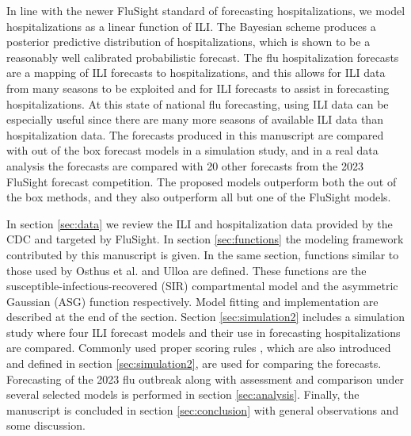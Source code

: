 In line with the newer FluSight standard of forecasting hospitalizations, we 
model hospitalizations as a linear function of ILI. The Bayesian scheme 
produces a posterior predictive distribution of hospitalizations, which is 
shown to be a reasonably well calibrated probabilistic forecast.
The flu hospitalization forecasts are a mapping of ILI forecasts to 
hospitalizations, and this allows for ILI data from many seasons to be exploited 
and for ILI forecasts to assist in forecasting hospitalizations.
At this state of national flu forecasting, using ILI data can be especially
useful since there are many more seasons of available ILI data than 
hospitalization data. 
The forecasts produced in this manuscript are compared with out of the box 
forecast models in a simulation study, and in a real data analysis the 
forecasts are compared with 20 other forecasts from the 2023 FluSight forecast
competition. The proposed models outperform both the out of the box methods, and
they also outperform all but one of the FluSight models.

In section \ref{sec:data} we review the ILI and hospitalization data provided 
by the CDC and targeted by FluSight. 
In section \ref{sec:functions} the modeling framework contributed by this 
manuscript is given. In the same section, functions similar to those used by 
Osthus et al. \cite[]{osthus2019dynamic} and Ulloa \cite[]{ulloa2019} are 
defined.
 These functions are the susceptible-infectious-recovered (SIR) compartmental 
 model and the asymmetric Gaussian (ASG) function  respectively. Model fitting 
 and implementation are described at the end of the section. Section 
 \ref{sec:simulation2} includes a simulation study where four ILI forecast 
 models and their use in forecasting hospitalizations are compared. Commonly 
 used proper scoring rules \cite[]{gneiting2007strictly}, which are also 
 introduced and defined in section \ref{sec:simulation2}, are used for 
 comparing the forecasts. Forecasting of the 2023 flu outbreak along with 
 assessment and comparison under several selected models is performed in 
 section \ref{sec:analysis}. 
 Finally, the manuscript is concluded in section \ref{sec:conclusion} with 
 general observations and some discussion.
 
 
 
 
 
 
 
 
 
 
 
 
